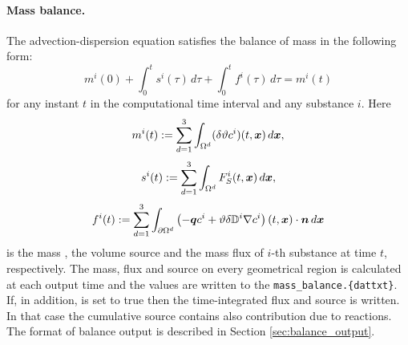 \paragraph{Mass balance.}
The advection-dispersion equation satisfies the balance of mass in the following form:
$$ m^i(0) + \int_0^t s^i(\tau) \,d\tau + \int_0^t f^i(\tau) \,d\tau = m^i(t) $$
for any instant $t$ in the computational time interval and any substance $i$.
Here
$$ m^i(t) := \sum_{d=1}^3\int_{\Omega^d}(\delta\vartheta c^i)(t,\mathbf{\boldsymbol{x}})\,d\mathbf{\boldsymbol{x}}, $$
$$ s^i(t) := \sum_{d=1}^3\int_{\Omega^d}F_S^i(t,\mathbf{\boldsymbol{x}})\,d\mathbf{\boldsymbol{x}}, $$
$$ f^i(t) := \sum_{d=1}^3\int_{\partial\Omega^d}\left(-\mathbf{\boldsymbol{q}} c^i + \vartheta\delta{{\mathbb{D}}}^i\nabla c^i\right)(t,\mathbf{\boldsymbol{x}})\cdot\mathbf{\boldsymbol{n}} \,d\mathbf{\boldsymbol{x}} $$
is the mass , the volume source  and the mass flux  of $i$-th substance at time $t$, respectively.
The mass, flux and source on every geometrical region is calculated at each output time and the values are written to the  \texttt{mass\_balance.\{dat\textbar txt\}}.
If, in addition,  is set to true then the time-integrated flux and source is written.
In that case the cumulative source contains also contribution due to reactions.
The format of balance output is described in Section \ref{sec:balance_output}.






